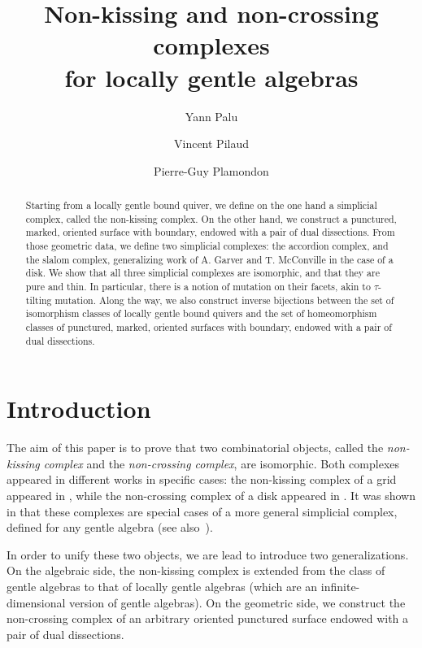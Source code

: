 \documentclass{amsart}
\title[Non-kissing and non-crossing complexes for locally gentle algebras]{Non-kissing and non-crossing complexes \\ for locally gentle algebras}
\author{Yann Palu}
\author{Vincent Pilaud}
\author{Pierre-Guy Plamondon}
\theoremstyle{definition}
\begin{document}
\begin{abstract}
Starting from a locally gentle bound quiver, we define on the one hand a simplicial complex, called the non-kissing complex.
On the other hand, we construct a punctured, marked, oriented surface with boundary, endowed with a pair of dual dissections.
From those geometric data, we define two simplicial complexes: the accordion complex, and the slalom complex, generalizing work of A. Garver and T. McConville in the case of a disk.
We show that all three simplicial complexes are isomorphic, and that they are pure and thin.
In particular, there is a notion of mutation on their facets, akin to $\tau$-tilting mutation.
Along the way, we also construct inverse bijections between the set of isomorphism classes of locally gentle bound quivers and the set of homeomorphism classes of punctured, marked, oriented surfaces with boundary, endowed with a pair of dual dissections.
\end{abstract}

\vspace*{-1cm}
\maketitle
\vspace{-.5cm}

\section{Introduction}
The aim of this paper is to prove that two combinatorial objects, called the \emph{non-kissing complex} and the \emph{non-crossing complex}, are isomorphic.
Both complexes appeared in different works in specific cases: the non-kissing complex of a grid appeared in \cite{McConville}, while the non-crossing complex of a disk appeared in \cite{GarverMcConville, MannevillePilaud-accordion}.
It was shown in \cite{PaluPilaudPlamondon} that these complexes are special cases of a more general simplicial complex, defined for any gentle algebra (see also~\cite{BrustleDouvilleMousavandThomasYildirim}).

In order to unify these two objects, we are lead to introduce two generalizations.
On the algebraic side, the non-kissing complex is extended from the class of gentle algebras to that of locally gentle algebras (which are an infinite-dimensional version of gentle algebras).
On the geometric side, we construct the non-crossing complex of an arbitrary oriented punctured surface endowed with a pair of dual dissections.
\end{document}
